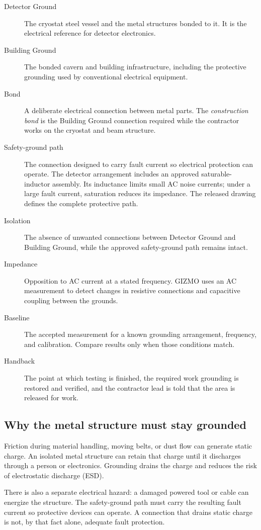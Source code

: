 \documentclass[11pt]{article}
\begin{document}
\begin{description}
  \item[Detector Ground] The cryostat steel vessel and the metal structures bonded to it. It is the electrical reference for detector electronics.
  \item[Building Ground] The bonded cavern and building infrastructure, including the protective grounding used by conventional electrical equipment.
  \item[Bond] A deliberate electrical connection between metal parts. The \emph{construction bond} is the Building Ground connection required while the contractor works on the cryostat and beam structure.
  \item[Safety-ground path] The connection designed to carry fault current so electrical protection can operate. The detector arrangement includes an approved saturable-inductor assembly. Its inductance limits small AC noise currents; under a large fault current, saturation reduces its impedance. The released drawing defines the complete protective path.
  \item[Isolation] The absence of unwanted connections between Detector Ground and Building Ground, while the approved safety-ground path remains intact.
  \item[Impedance] Opposition to AC current at a stated frequency. GIZMO uses an AC measurement to detect changes in resistive connections and capacitive coupling between the grounds.
  \item[Baseline] The accepted measurement for a known grounding arrangement, frequency, and calibration. Compare results only when those conditions match.
  \item[Handback] The point at which testing is finished, the required work grounding is restored and verified, and the contractor lead is told that the area is released for work.
\end{description}

\subsection{Why the metal structure must stay grounded}

Friction during material handling, moving belts, or dust flow can generate static charge. An isolated metal structure can retain that charge until it discharges through a person or electronics. Grounding drains the charge and reduces the risk of electrostatic discharge (ESD).

There is also a separate electrical hazard: a damaged powered tool or cable can energize the structure. The safety-ground path must carry the resulting fault current so protective devices can operate. A connection that drains static charge is not, by that fact alone, adequate fault protection.
\end{document}
